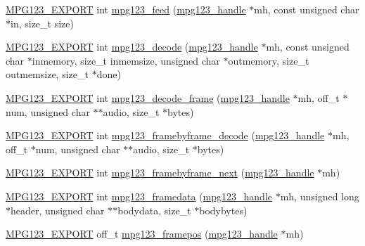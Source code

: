 \begin{DoxyCompactItemize}
\item 
\hyperlink{mpg123_8h_a2ba98cfba3f760879df70e755b2a61cc}{M\+P\+G123\+\_\+\+E\+X\+P\+O\+RT} int \hyperlink{group__mpg123__input_ga0a50910ce7bf0b30921114a89cc78d29}{mpg123\+\_\+feed} (\hyperlink{group__mpg123__init_ga6728e2839a395f3a07d4514da659faca}{mpg123\+\_\+handle} $\ast$mh, const unsigned char $\ast$in, size\+\_\+t size)
\item 
\hyperlink{mpg123_8h_a2ba98cfba3f760879df70e755b2a61cc}{M\+P\+G123\+\_\+\+E\+X\+P\+O\+RT} int \hyperlink{group__mpg123__input_gafaf2382b208257a9685a8cab9f4360be}{mpg123\+\_\+decode} (\hyperlink{group__mpg123__init_ga6728e2839a395f3a07d4514da659faca}{mpg123\+\_\+handle} $\ast$mh, const unsigned char $\ast$inmemory, size\+\_\+t inmemsize, unsigned char $\ast$outmemory, size\+\_\+t outmemsize, size\+\_\+t $\ast$done)
\item 
\hyperlink{mpg123_8h_a2ba98cfba3f760879df70e755b2a61cc}{M\+P\+G123\+\_\+\+E\+X\+P\+O\+RT} int \hyperlink{group__mpg123__input_gabcc91dfcc46df4bdef267b8061ffcce0}{mpg123\+\_\+decode\+\_\+frame} (\hyperlink{group__mpg123__init_ga6728e2839a395f3a07d4514da659faca}{mpg123\+\_\+handle} $\ast$mh, off\+\_\+t $\ast$num, unsigned char $\ast$$\ast$audio, size\+\_\+t $\ast$bytes)
\item 
\hyperlink{mpg123_8h_a2ba98cfba3f760879df70e755b2a61cc}{M\+P\+G123\+\_\+\+E\+X\+P\+O\+RT} int \hyperlink{group__mpg123__input_gad6e52cca146bcd6db3954e88fb86bc82}{mpg123\+\_\+framebyframe\+\_\+decode} (\hyperlink{group__mpg123__init_ga6728e2839a395f3a07d4514da659faca}{mpg123\+\_\+handle} $\ast$mh, off\+\_\+t $\ast$num, unsigned char $\ast$$\ast$audio, size\+\_\+t $\ast$bytes)
\item 
\hyperlink{mpg123_8h_a2ba98cfba3f760879df70e755b2a61cc}{M\+P\+G123\+\_\+\+E\+X\+P\+O\+RT} int \hyperlink{group__mpg123__input_gad10c57bc8060c64652b014a2593de61a}{mpg123\+\_\+framebyframe\+\_\+next} (\hyperlink{group__mpg123__init_ga6728e2839a395f3a07d4514da659faca}{mpg123\+\_\+handle} $\ast$mh)
\item 
\hyperlink{mpg123_8h_a2ba98cfba3f760879df70e755b2a61cc}{M\+P\+G123\+\_\+\+E\+X\+P\+O\+RT} int \hyperlink{group__mpg123__input_gaa4c4e18d7defd6e5fb7addc3caf8d946}{mpg123\+\_\+framedata} (\hyperlink{group__mpg123__init_ga6728e2839a395f3a07d4514da659faca}{mpg123\+\_\+handle} $\ast$mh, unsigned long $\ast$header, unsigned char $\ast$$\ast$bodydata, size\+\_\+t $\ast$bodybytes)
\item 
\hyperlink{mpg123_8h_a2ba98cfba3f760879df70e755b2a61cc}{M\+P\+G123\+\_\+\+E\+X\+P\+O\+RT} off\+\_\+t \hyperlink{group__mpg123__input_gaf8d143984f9fd2ea91e9b10a6110c129}{mpg123\+\_\+framepos} (\hyperlink{group__mpg123__init_ga6728e2839a395f3a07d4514da659faca}{mpg123\+\_\+handle} $\ast$mh)
\end{DoxyCompactItemize}


